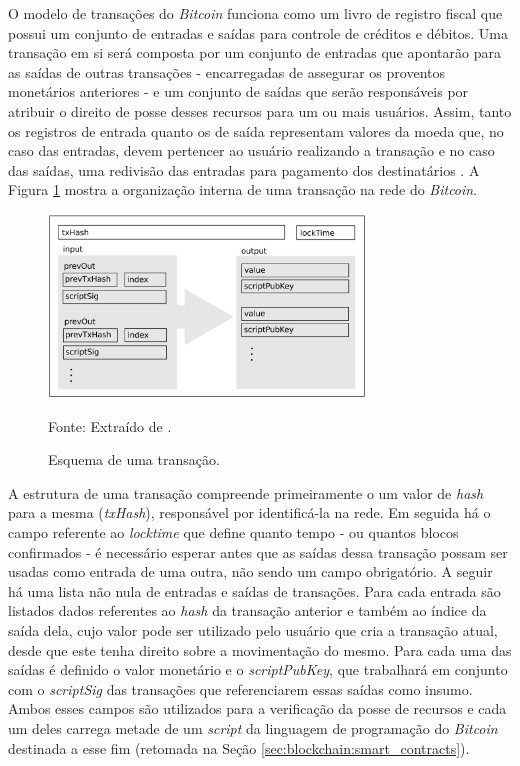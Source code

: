 %
O modelo de transações do \textit{Bitcoin} funciona como um livro de registro fiscal que possui um conjunto de entradas e saídas para controle de créditos e débitos. Uma transação em si será composta por um conjunto de entradas que apontarão para as saídas de outras transações - encarregadas de assegurar os proventos monetários anteriores - e um conjunto de saídas que serão responsáveis por atribuir o direito de posse desses recursos para um ou mais usuários. Assim, tanto os registros de entrada quanto os de saída representam valores da moeda que, no caso das entradas, devem pertencer ao usuário realizando a transação e no caso das saídas, uma redivisão das entradas para pagamento dos destinatários \cite{blockchain:documentacao_bitcoin}. A Figura \ref{fig:blockchain:transacao} mostra a organização interna de uma transação na rede do \textit{Bitcoin}.

\begin{figure}[ht]
\caption{Esquema de uma transação.}
\centering
\includegraphics[width=0.75\textwidth]{imagens/esquema_transacao.png}
\begin{center}
        Fonte: Extraído de \cite{blockchain:survey_bitcoin}.
\end{center}
\label{fig:blockchain:transacao}
\end{figure}

A estrutura de uma transação compreende primeiramente o um valor de \textit{hash} para a mesma (\textit{txHash}), responsável por identificá-la na rede. Em seguida há o campo referente ao \textit{locktime} que define quanto tempo - ou quantos blocos confirmados - é necessário esperar antes que as saídas dessa transação possam ser usadas como entrada de uma outra, não sendo um campo obrigatório. A seguir há uma lista não nula de entradas e saídas de transações. Para cada entrada são listados dados referentes ao \textit{hash} da transação anterior e também ao índice da saída dela, cujo valor pode ser utilizado pelo usuário que cria a transação atual, desde que este tenha direito sobre a movimentação do mesmo. Para cada uma das saídas é definido o valor monetário e o \textit{scriptPubKey}, que trabalhará em conjunto com o \textit{scriptSig} das transações que referenciarem essas saídas como insumo. Ambos esses campos são utilizados para a verificação da posse de recursos e cada um deles carrega metade de um \textit{script} da linguagem de programação do \textit{Bitcoin} destinada a esse fim (retomada na Seção \ref{sec:blockchain:smart_contracts}).

